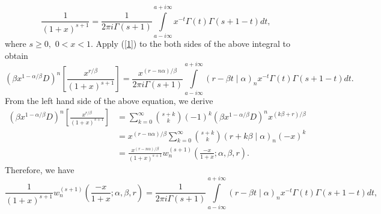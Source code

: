 \documentclass{article}%
\begin{document}
\[
\frac{1}{\left(  1+x\right)  ^{s+1}}=\frac{1}{2\pi i\Gamma\left(  s+1\right)
}%
{\displaystyle\int\limits_{a-i\infty}^{a+i\infty}}
x^{-t}\Gamma\left(  t\right)  \Gamma\left(  s+1-t\right)  dt,
\]
where $s\geq0,$ $0<x<1.$ Apply (\ref{1}) to the both sides of the above
integral to obtain
\[
\left(  \beta x^{1-\alpha/\beta}D\right)  ^{n}\left[  \frac{x^{r/\beta}%
}{\left(  1+x\right)  ^{s+1}}\right]  =\frac{x^{\left(  r-n\alpha\right)
/\beta}}{2\pi i\Gamma\left(  s+1\right)  }%
{\displaystyle\int\limits_{a-i\infty}^{a+i\infty}}
\left(  r-\beta t\mid\alpha\right)  _{n}x^{-t}\Gamma\left(  t\right)
\Gamma\left(  s+1-t\right)  dt.
\]
From the left hand side of the above equation, we derive%
\begin{align*}
\left(  \beta x^{1-\alpha/\beta}D\right)  ^{n}\left[  \frac{x^{r/\beta}%
}{\left(  1+x\right)  ^{s+1}}\right]   &  =\sum_{k=0}^{\infty}\binom{s+k}%
{k}\left(  -1\right)  ^{k}\left(  \beta x^{1-\alpha/\beta}D\right)
^{n}x^{\left(  k\beta+r\right)  /\beta}\\
&  =x^{\left(  r-n\alpha\right)  /\beta}\sum_{k=0}^{\infty}\binom{s+k}%
{k}\left(  r+k\beta\mid\alpha\right)  _{n}\left(  -x\right)  ^{k}\\
&  =\frac{x^{\left(  r-n\alpha\right)  /\beta}}{\left(  1+x\right)  ^{s+1}%
}w_{n}^{\left(  s+1\right)  }\left(  \frac{-x}{1+x};\alpha,\beta,r\right)  .
\end{align*}
Therefore, we have
\begin{equation}
\frac{1}{\left(  1+x\right)  ^{s+1}}w_{n}^{\left(  s+1\right)  }\left(
\frac{-x}{1+x};\alpha,\beta,r\right)  =\frac{1}{2\pi i\Gamma\left(
s+1\right)  }%
{\displaystyle\int\limits_{a-i\infty}^{a+i\infty}}
\left(  r-\beta t\mid\alpha\right)  _{n}x^{-t}\Gamma\left(  t\right)
\Gamma\left(  s+1-t\right)  dt, \label{12}%
\end{equation}
\end{document}
